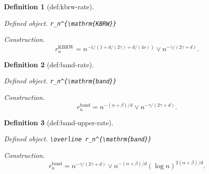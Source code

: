 \documentclass{article}
\newtheorem{definition}{Definition}
\begin{document}
\begin{definition}[def:kbrw-rate]\label{def:kbrw-rate}
\par\smallskip\noindent\emph{Defined object.} \texttt{r\_\allowbreak{}n\textasciicircum{}\{\textbackslash{}\allowbreak{}mathrm\{KBRW\}\allowbreak{}\}\allowbreak{}}
\par\smallskip\noindent\emph{Construction.} \[r_n^{\mathrm{KBRW}}=n^{-1/(1+d/(2\gamma)+d/(4s))}\vee n^{-\gamma/(2\gamma+d)}.\]
\end{definition}

\begin{definition}[def:band-rate]\label{def:band-rate}
\par\smallskip\noindent\emph{Defined object.} \texttt{r\_\allowbreak{}n\textasciicircum{}\{\textbackslash{}\allowbreak{}mathrm\{band\}\allowbreak{}\}\allowbreak{}}
\par\smallskip\noindent\emph{Construction.} \[r_n^{\mathrm{band}}=n^{-(\alpha+\beta)/d}\vee n^{-\gamma/(2\gamma+d)}.\]
\end{definition}

\begin{definition}[def:band-upper-rate]\label{def:band-upper-rate}
\par\smallskip\noindent\emph{Defined object.} \texttt{\textbackslash{}\allowbreak{}overline r\_\allowbreak{}n\textasciicircum{}\{\textbackslash{}\allowbreak{}mathrm\{band\}\allowbreak{}\}\allowbreak{}}
\par\smallskip\noindent\emph{Construction.} \[\overline r_n^{\mathrm{band}}=n^{-\gamma/(2\gamma+d)}\vee n^{-(\alpha+\beta)/d}(\log n)^{2(\alpha+\beta)/d}.\]
\end{definition}
\end{document}

